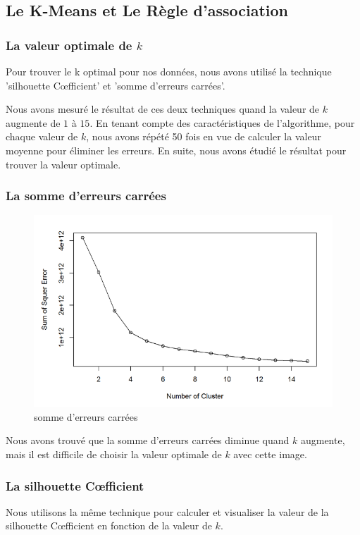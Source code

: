 \subsection{Le K-Means et Le Règle d'association }
\subsubsection{La valeur optimale de $k$}
Pour trouver le k optimal pour nos données, nous avons utilisé la technique 'silhouette C\oe fficient' et 'somme d'erreurs carrées'.

Nous avons mesuré le résultat de ces deux techniques quand la valeur de $k$ augmente de $1$ à $15$. En tenant compte des caractéristiques de l'algorithme, pour chaque valeur de $k$, nous avons répété 50 fois en vue de calculer la valeur moyenne pour éliminer les erreurs. En suite, nous avons étudié le résultat pour trouver la valeur optimale.
\subsubsection*{La somme d'erreurs carrées}
\begin{figure}[H]
\centering
\includegraphics[width=0.8\linewidth]{images/sse}
\caption{somme d'erreurs carrées}
\label{fig:sse}
\end{figure}
Nous avons trouvé que la somme d'erreurs carrées diminue quand $k$ augmente, mais il est difficile de choisir la valeur optimale de $k$ avec cette image.

\subsubsection*{La silhouette C\oe fficient}
Nous utilisons la même technique pour calculer et visualiser la valeur de la silhouette C\oe fficient en fonction de la valeur de $k$.

